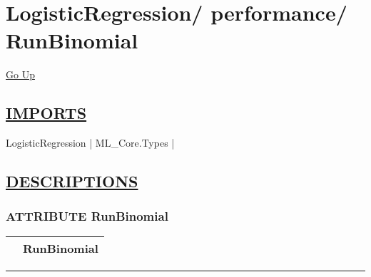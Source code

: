 \chapter*{\color{headfile}
{\large LogisticRegression\slash\hspace{0pt}}
{\large performance\slash\hspace{0pt}}
 \\
RunBinomial
}
\hypertarget{ecldoc:toc:LogisticRegression.performance.RunBinomial}{}
\hyperlink{ecldoc:toc:root/LogisticRegression/performance}{Go Up}

\section*{\underline{\textsf{IMPORTS}}}
\begin{doublespace}
{\large
LogisticRegression |
ML\_Core.Types |
}
\end{doublespace}

\section*{\underline{\textsf{DESCRIPTIONS}}}
\subsection*{\textsf{\colorbox{headtoc}{\color{white} ATTRIBUTE}
RunBinomial}}

\hypertarget{ecldoc:logisticregression.performance.runbinomial}{}

{\renewcommand{\arraystretch}{1.5}
\begin{tabularx}{\textwidth}{|>{\raggedright\arraybackslash}l|X|}
\hline
\hspace{0pt}\mytexttt{\color{red} } & \textbf{RunBinomial} \\
\hline
\end{tabularx}
}

\par


\rule{\linewidth}{0.5pt}
